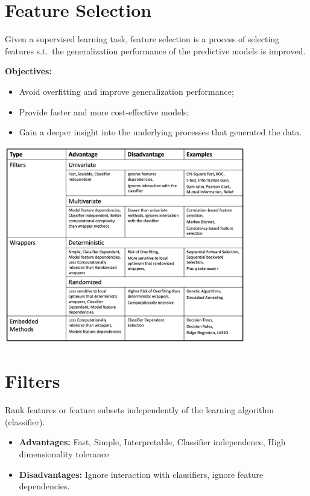 \section*{Feature Selection}

Given a supervised learning task, feature selection is a process of selecting features s.t.\ the generalization performance of the predictive models is improved.

\textbf{Objectives:}
\begin{itemize}
    \item Avoid overfitting and improve generalization performance;
    \item Provide faster and more cost-effective models;
    \item Gain a deeper insight into the underlying processes that generated the data.
\end{itemize}

\begin{center}
\includegraphics[width=0.8\textwidth]{images/image6.png}
\end{center}

\section*{Filters}
Rank features or feature subsets independently of the learning algorithm (classifier).

\begin{itemize}
    \item \textbf{Advantages:} Fast, Simple, Interpretable, Classifier independence, High dimensionality tolerance
    \item \textbf{Disadvantages:} Ignore interaction with classifiers, ignore feature dependencies.
\end{itemize}

